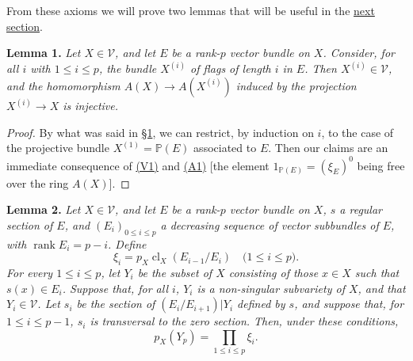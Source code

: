 \documentclass{article}
\newenvironment{itenv}[1]
  {\phantomsection\par\medskip\noindent\textbf{#1.}\itshape}
  {\par\medskip}
\renewcommand{\cal}[1]{{\mathcal{#1}}}
\renewcommand{\leq}{\leqslant}
\DeclareMathOperator{\rank}{rank}
\DeclareMathOperator{\cl}{cl}
\begin{document}
From these axioms we will prove two lemmas that will be useful in the \hyperref[section3]{next section}.

\begin{itenv}{Lemma 1}
\label{lemma1}
  Let $X\in\cal{V}$, and let $E$ be a rank-$p$ vector bundle on $X$.
  Consider, for all $i$ with $1\leq i\leq p$, the bundle $X^{(i)}$ of flags of length $i$ in $E$.
  Then $X^{(i)}\in\cal{V}$, and the homomorphism $A(X)\to A(X^{(i)})$ induced by the projection $X^{(i)}\to X$ is \emph{injective}.
\end{itenv}

\begin{proof}
  By what was said in \hyperref[section1]{\S1}, we can restrict, by induction on $i$, to the case of the projective bundle $X^{(1)}=\mathbb{P}(E)$ associated to $E$.
  Then our claims are an immediate consequence of \hyperref[axiomV1]{(V1)} and \hyperref[axiomA1]{(A1)} [the element $1_{\mathbb{P}(E)}=(\xi_E)^0$ being free over the ring $A(X)$].
\end{proof}

\begin{itenv}{Lemma 2}
\label{lemma2}
  Let $X\in\cal{V}$, and let $E$ be a rank-$p$ vector bundle on $X$, $s$ a regular section of $E$, and $(E_i)_{0\leq i\leq p}$ a decreasing sequence of vector subbundles of $E$, with $\rank E_i=p-i$.
  Define
  \[
    \xi_i = p_X\cl_X(E_{i-1}/E_i)
    \quad\mbox{($1\leq i\leq p$).}
  \]
  For every $1\leq i\leq p$, let $Y_i$ be the subset of $X$ consisting of those $x\in X$ such that $s(x)\in E_i$.
  Suppose that, for all $i$, $Y_i$ is a non-singular subvariety of $X$, and that $Y_i\in\cal{V}$.
  Let $s_i$ be the section of $(E_i/E_{i+1})|Y_i$ defined by $s$, and suppose that, for $1\leq i\leq p-1$, $s_i$ is transversal to the zero section.
  Then, under these conditions,
  \[
    p_X(Y_p) = \prod_{1\leq i\leq p}\xi_i.
  \]
\end{itenv}
\end{document}
